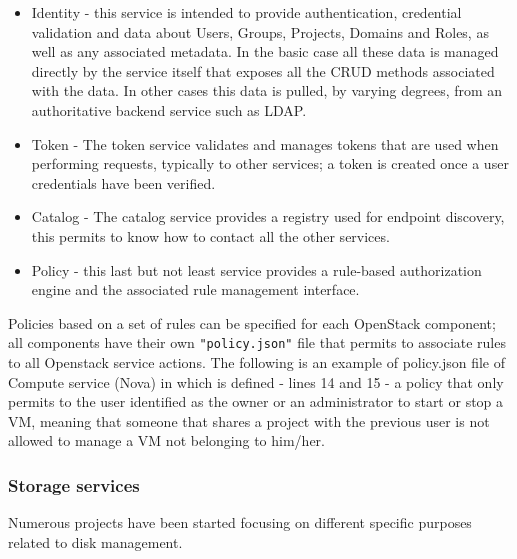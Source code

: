 \begin{itemize}

\item Identity - this service is intended to provide authentication, credential validation and data about Users, Groups, Projects, Domains and Roles, as well as any associated metadata. In the basic case all these data is managed directly by the service itself that exposes all the CRUD methods associated with the data. In other cases this data is pulled, by varying degrees, from an authoritative backend service such as LDAP. 

\item Token - The token service validates and manages tokens that are used when performing requests, typically to other services; a token is created once a user credentials have been verified.

\item Catalog - The catalog service provides a registry used for endpoint discovery, this permits to know how to contact all the other services.

\item Policy - this last but not least service provides a rule-based authorization engine and the associated rule management interface.

\end{itemize}

Policies based on a set of rules can be specified for each OpenStack component; all components have their own \texttt{"policy.json"} file that permits to associate rules to all Openstack service actions. The following is an example of policy.json file of Compute service (Nova) in which is defined - lines 14 and 15 - a policy that only permits to the user identified as the owner or an administrator to start or stop a VM, meaning that someone that shares a project with the previous user is not allowed to manage a VM not belonging to him/her.







\subsubsection{Storage services}
\label{sec:openstack_storage}
Numerous projects have been started focusing on different specific purposes related to disk management.


